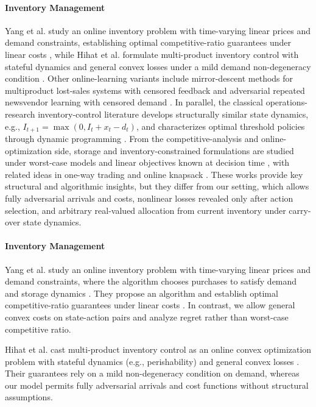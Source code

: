 \documentclass[11pt]{article}
\begin{document}
\paragraph{Inventory Management}
Yang et al. study an online inventory problem with time-varying linear prices and demand constraints, establishing optimal competitive-ratio guarantees under linear costs \cite{yang2020online}, while Hihat et al. formulate multi-product inventory control with stateful dynamics and general convex losses under a mild demand non-degeneracy condition \cite{hihat2023inventory}. Other online-learning variants include mirror-descent methods for multiproduct lost-sales systems with censored feedback \cite{guo2024omd} and adversarial repeated newsvendor learning with censored demand \cite{lugosi2024hardness}. In parallel, the classical operations-research inventory-control literature develops structurally similar state dynamics, e.g., $I_{t+1}=\max(0,I_t+x_t-d_t)$, and characterizes optimal threshold policies through dynamic programming \cite{arrow1958studies,scarf1960optimality,zipkin2000foundations,porteus2002foundations}. From the competitive-analysis and online-optimization side, storage and inventory-constrained formulations are studied under worst-case models and linear objectives known at decision time \cite{Chau2016,Yang2020,yang2020online,lin2019competitive,chau2016cost,neely-inventory-control-cdc2010}, with related ideas in one-way trading and online knapsack \cite{cao2020optimal,el2001optimal}. These works provide key structural and algorithmic insights, but they differ from our setting, which allows fully adversarial arrivals and costs, nonlinear losses revealed only after action selection, and arbitrary real-valued allocation from current inventory under carry-over state dynamics. 

\paragraph{Inventory Management}
Yang et al. study an online inventory problem with time-varying linear prices and demand constraints, where the algorithm chooses purchases to satisfy demand and storage dynamics \cite{yang2020online}. They propose an algorithm and establish optimal competitive-ratio guarantees under linear costs \cite{yang2020online}. In contrast, we allow general convex costs on state-action pairs and analyze regret rather than worst-case competitive ratio.

Hihat et al. cast multi-product inventory control as an online convex optimization problem with stateful dynamics (e.g., perishability) and general convex losses \cite{hihat2023inventory}. Their guarantees rely on a mild non-degeneracy condition on demand, whereas our model permits fully adversarial arrivals and cost functions without structural assumptions.
\end{document}
